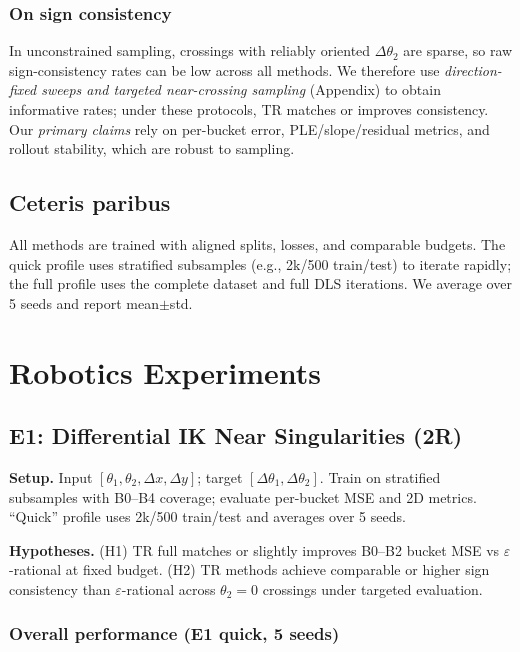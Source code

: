 \documentclass[11pt,twoside]{article}
\begin{document}
\subsubsection{On sign consistency}

In unconstrained sampling, crossings with reliably oriented $\Delta\theta_2$ are sparse, so raw sign-consistency rates can be low across all methods. We therefore use \emph{direction-fixed sweeps and targeted near-crossing sampling} (Appendix) to obtain informative rates; under these protocols, TR matches or improves consistency. Our \emph{primary claims} rely on per-bucket error, PLE/slope/residual metrics, and rollout stability, which are robust to sampling.

\subsection{Ceteris paribus}

All methods are trained with aligned splits, losses, and comparable budgets. The quick profile uses stratified subsamples (e.g., 2k/500 train/test) to iterate rapidly; the full profile uses the complete dataset and full DLS iterations. We average over 5 seeds and report mean$\pm$std.

\section{Robotics Experiments}
\label{sec:experiments}

\subsection{E1: Differential IK Near Singularities (2R)}
\textbf{Setup.} Input $[\theta_1,\theta_2,\Delta x,\Delta y]$; target $[\Delta\theta_1,\Delta\theta_2]$. Train on stratified subsamples with B0--B4 coverage; evaluate per-bucket MSE and 2D metrics. ``Quick'' profile uses 2k/500 train/test and averages over 5 seeds.

\textbf{Hypotheses.} (H1) TR full matches or slightly improves B0--B2 bucket MSE vs $\varepsilon$-rational at fixed budget. (H2) TR methods achieve comparable or higher sign consistency than $\varepsilon$-rational across $\theta_2=0$ crossings under targeted evaluation.

\subsubsection{Overall performance (E1 quick, 5 seeds)}
\end{document}
